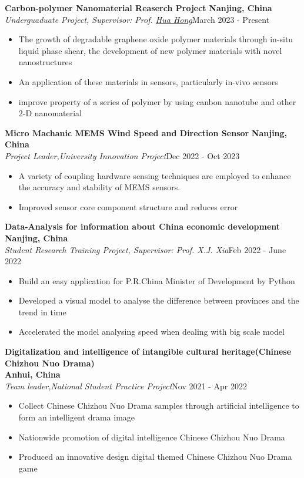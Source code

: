 \documentclass[letterpaper,11pt]{article}
\begin{document}
{\bf Carbon-polymer Nanomaterial Reaserch Project}  \hfill{\textbf{Nanjing, China} }\\
\textit{Underguaduate Project, Supervisor: Prof. {\href{https://ic.seu.edu.cn/honghua/main.htm}{Hua Hong}}}\hfill{March 2023 - Present}
\begin{itemize}
    \item The growth of degradable graphene oxide polymer materials through in-situ liquid phase shear, the development of new polymer materials with novel nanostructures
    \item An application of these materials in sensors, particularly in-vivo sensors
     \item improve property of a series of polymer by using canbon nanotube and other 2-D nanomaterial 
\end{itemize}
\vspace{2pt}
{\bf Micro Machanic MEMS Wind Speed and Direction Sensor }  \hfill{\textbf{Nanjing, China} }\\
\textit{Project Leader,University Innovation Project}\hfill{Dec 2022 - Oct 2023}
\begin{itemize}
    \item A variety of coupling hardware sensing techniques are employed to enhance the accuracy and stability of MEMS sensors.
    \item Improved sensor core component structure and reduces error

\end{itemize}

{\bf Data-Analysis for information about China economic development}  \hfill{\textbf{Nanjing, China} }\\
\textit{Student Research Training Project, Supervisor: Prof. {{X.J. Xia}}}\hfill{Feb 2022 - June 2022}
\begin{itemize}
    \item Build an easy application for P.R.China Minister of Development by Python
    \item Developed a visual model to analyse the difference between provinces and the trend in time
    \item Accelerated the model analysing speed when dealing with big scale model
\end{itemize}

\vspace{2pt}
{\bf Digitalization and intelligence of intangible cultural heritage(Chinese Chizhou Nuo Drama)}  
\\
\hfill{\textbf{Anhui, China} }\\
\textit{Team leader,National Student Practice Project}\hfill{Nov 2021 - Apr 2022}
\begin{itemize}
    \item Collect Chinese Chizhou Nuo Drama samples through artificial intelligence to form an intelligent drama image
    \item Nationwide promotion of digital intelligence Chinese Chizhou Nuo Drama
    \item Produced an innovative design digital themed Chinese Chizhou Nuo Drama game
\end{itemize}
\vspace{2pt}
\end{document}

